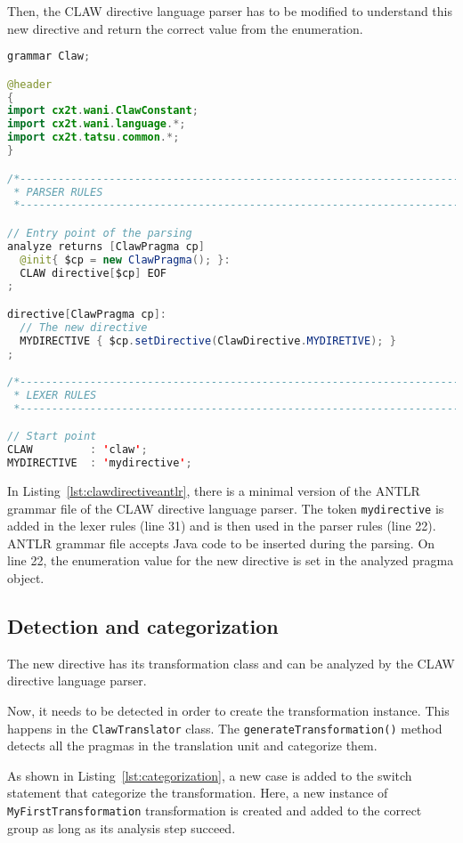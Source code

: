 Then, the CLAW directive language parser has to be modified to understand 
this new directive and return the correct value from the enumeration.

\begin{lstlisting}[label=lst:clawdirectiveantlr, caption=Claw.g4, 
  language=java]
grammar Claw;

@header
{
import cx2t.wani.ClawConstant;
import cx2t.wani.language.*;
import cx2t.tatsu.common.*;
}

/*----------------------------------------------------------------------------
 * PARSER RULES
 *----------------------------------------------------------------------------*/

// Entry point of the parsing
analyze returns [ClawPragma cp]
  @init{ $cp = new ClawPragma(); }:
  CLAW directive[$cp] EOF
;

directive[ClawPragma cp]:
  // The new directive
  MYDIRECTIVE { $cp.setDirective(ClawDirective.MYDIRETIVE); }
;

/*----------------------------------------------------------------------------
 * LEXER RULES
 *----------------------------------------------------------------------------*/

// Start point
CLAW         : 'claw';
MYDIRECTIVE  : 'mydirective';
\end{lstlisting}

In Listing~\ref{lst:clawdirectiveantlr}, there is a minimal version of the
ANTLR grammar file of the CLAW directive language parser. The token
\lstinline|mydirective| is added in the lexer rules (line 31) and is then
used in the parser rules (line 22). ANTLR grammar file accepts Java code
to be inserted during the parsing. On line 22, the enumeration value for
the new directive is set in the analyzed pragma object.

\subsection{Detection and categorization}
The new directive has its transformation class and can be analyzed by the
CLAW directive language parser.

Now, it needs to be detected in order to create the transformation instance.
This happens in the \lstinline|ClawTranslator| class. The
\lstinline|generateTransformation()| method detects all the pragmas in the 
translation unit and categorize them.

As shown in Listing~\ref{lst:categorization}, a new case is added to the switch
statement that categorize the transformation. Here, a new instance of
\lstinline|MyFirstTransformation| transformation is created and added to the
correct group as long as its analysis step succeed.

